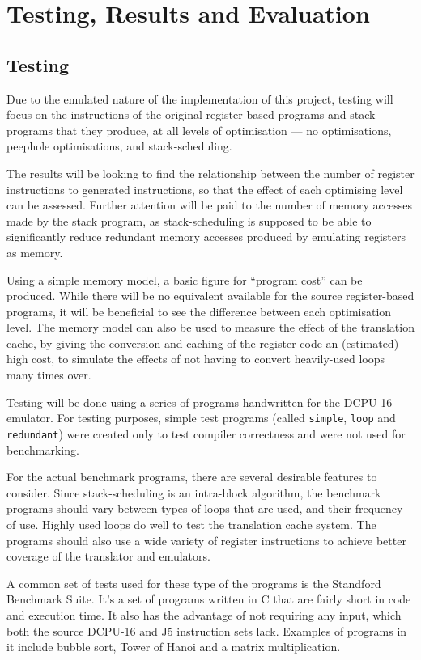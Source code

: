 \chapter{Testing, Results and Evaluation}\label{ch:testingresults}
\section{Testing}

Due to the emulated nature of the implementation of this project, testing will
focus on the instructions of the original register-based programs and stack
programs that they produce, at all levels of optimisation --- no optimisations,
peephole optimisations, and stack-scheduling.

The results will be looking to find the relationship between the number of
register instructions to generated instructions, so that the effect of each
optimising level can be assessed. Further attention will be paid to the number
of memory accesses made by the stack program, as stack-scheduling is supposed to
be able to significantly reduce redundant memory accesses produced by emulating
registers as memory.

Using a simple memory model, a basic figure for ``program cost'' can be
produced. While there will be no equivalent available for the source
register-based programs, it will be beneficial to see the difference between
each optimisation level. The memory model can also be used to measure the effect
of the translation cache, by giving the conversion and caching of the register
code an (estimated) high cost, to simulate the effects of not having to
convert heavily-used loops many times over.

Testing will be done using a series of programs handwritten for the DCPU-16
emulator. For testing purposes, simple test programs (called \texttt{simple},
\texttt{loop} and \texttt{redundant}) were created only to test compiler
correctness and were not used for benchmarking.

For the actual benchmark programs, there are several desirable features to
consider. Since stack-scheduling is an intra-block algorithm, the benchmark
programs should vary between types of loops that are used, and their frequency
of use. Highly used loops do well to test the translation cache system. The
programs should also use a wide variety of register instructions to achieve
better coverage of the translator and emulators.

A common set of tests used for these type of the programs is the Standford
Benchmark Suite\cite{stanford}. It's a set of programs written in C that are
fairly short in code and execution time. It also has the advantage of not
requiring any input, which both the source DCPU-16 and J5 instruction sets lack.
Examples of programs in it include bubble sort, Tower of Hanoi and a matrix
multiplication.

